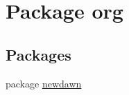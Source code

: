 \hypertarget{namespaceorg}{}\section{Package org}
\label{namespaceorg}
\subsection*{Packages}
\begin{DoxyCompactItemize}
\item 
package \mbox{\hyperlink{namespaceorg_1_1newdawn}{newdawn}}
\end{DoxyCompactItemize}
